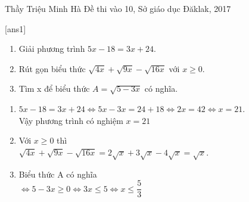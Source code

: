 \begin{name}
{Thầy Triệu Minh Hà}
{Đề thi vào 10, Sở giáo dục Đăklak, 2017}
\end{name}
\setcounter{ex}{0}
[ans1]
\begin{ex}%
    \hfill
    \begin{enumerate}
        \item Giải phương trình $5x-18=3x+24$.
        \item Rút gọn biểu thức $\sqrt{4x}+\sqrt{9x}-\sqrt{16x}$ với $ x\geq 0 $.
        \item Tìm x để biểu thức $A=\sqrt{5-3x} $ có nghĩa.
    \end{enumerate}
\loigiai
    {
    \begin{enumerate}
        \item $5x-18=3x+24\Leftrightarrow 5x-3x=24+18\Leftrightarrow 2x=42\Leftrightarrow x=21$.\\
        Vậy phương trình có nghiệm $ x=21$
        \item Với $x\geq 0  $ thì \\
        $\sqrt{4x}+\sqrt{9x}-\sqrt{16x}
        =2\sqrt{x}+3\sqrt{x}-4\sqrt{x}=\sqrt{x}$.
        \item Biểu thức A có nghĩa\\
        $\Leftrightarrow 5-3x\geq 0 \Leftrightarrow 3x \leq 5\Leftrightarrow x\leq \dfrac{5}{3}$
    \end{enumerate}
    }
\end{ex}

